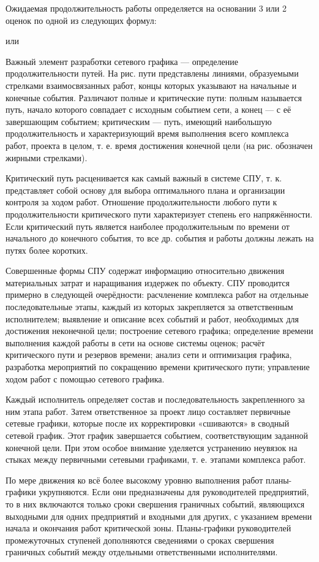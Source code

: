 Ожидаемая продолжительность работы определяется на основании 3 или 2 оценок по одной из следующих формул:

или 

Важный элемент разработки сетевого графика — определение продолжительности путей. На рис. пути представлены линиями, образуемыми стрелками взаимосвязанных работ, концы которых указывают на начальные и конечные события. Различают полные и критические пути: полным называется путь, начало которого совпадает с исходным событием сети, а конец — с её завершающим событием; критическим — путь, имеющий наибольшую продолжительность и характеризующий время выполнения всего комплекса работ, проекта в целом, т. е. время достижения конечной цели (на рис. обозначен жирными стрелками).

Критический путь расценивается как самый важный в системе СПУ, т. к. представляет собой основу для выбора оптимального плана и организации контроля за ходом работ. Отношение продолжительности любого пути к продолжительности критического пути характеризует степень его напряжённости. Если критический путь является наиболее продолжительным по времени от начального до конечного события, то все др. события и работы должны лежать на путях более коротких.

Совершенные формы СПУ содержат информацию относительно движения материальных затрат и наращивания издержек по объекту. СПУ проводится примерно в следующей очерёдности: расчленение комплекса работ на отдельные последовательные этапы, каждый из которых закрепляется за ответственным исполнителем; выявление и описание всех событий и работ, необходимых для достижения неконечной цели; построение сетевого графика; определение времени выполнения каждой работы в сети на основе системы оценок; расчёт критического пути и резервов времени; анализ сети и оптимизация графика, разработка мероприятий по сокращению времени критического пути; управление ходом работ с помощью сетевого графика.

Каждый исполнитель определяет состав и последовательность закрепленного за ним этапа работ. Затем ответственное за проект лицо составляет первичные сетевые графики, которые после их корректировки «сшиваются» в сводный сетевой график. Этот график завершается событием, соответствующим заданной конечной цели. При этом особое внимание уделяется устранению неувязок на стыках между первичными сетевыми графиками, т. е. этапами комплекса работ.

По мере движения ко всё более высокому уровню выполнения работ планы-графики укрупняются. Если они предназначены для руководителей предприятий, то в них включаются только сроки свершения граничных событий, являющихся выходными для одних предприятий и входными для других, с указанием времени начала и окончания работ критической зоны. Планы-графики руководителей промежуточных ступеней дополняются сведениями о сроках свершения граничных событий между отдельными ответственными исполнителями.

